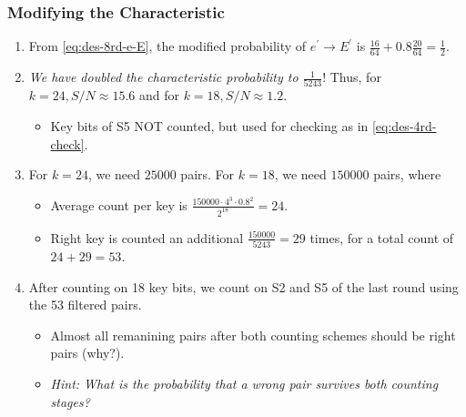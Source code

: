 \documentclass{beamer}
\begin{document}
    \begin{frame}
        \frametitle{Modifying the Characteristic}
        \begin{enumerate}
            \item<1-> From \eqref{eq:des-8rd-e-E}, the modified probability of
            \(e^\prime \rightarrow E^\prime\) is \(\frac{16}{64} +
            0.8\frac{20}{64} = \frac{1}{2}\).
            \item<2-> \emph{We have doubled the characteristic probability to
            \(\frac{1}{5243}\)}! Thus, for \(k = 24, S/N \approx 15.6\) and for
            \(k = 18, S/N \approx 1.2\).
            \begin{itemize}
                \item<3-> Key bits of S5 NOT counted, but used for checking as
                in \eqref{eq:des-4rd-check}.
            \end{itemize}
            \item<4-> For \(k = 24\), we need \(25000\) pairs. For \(k = 18\),
            we need \(150000\) pairs, where
            \begin{itemize}
                \item Average count per key is \(\frac{150000 \cdot 4^3 \cdot
                0.8^2}{2^{18}} = 24\).
                \item Right key is counted an additional \(\frac{150000}{5243} =
                29\) times, for a total count of \(24 + 29 = 53\).
            \end{itemize}
            \item<5-> After counting on 18 key bits, we count on S2 and S5 of the
            last round using the 53 filtered pairs.
            \begin{itemize}
                \item Almost all remanining pairs after both counting schemes
                should be right pairs (why?).
                \item<6-> \emph{Hint: What is the probability that a wrong pair
                survives both counting stages?}
            \end{itemize}
        \end{enumerate}
    \end{frame}
\end{document}
